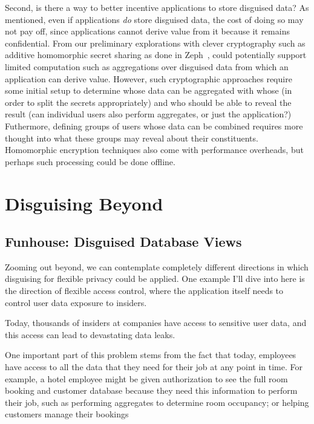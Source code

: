 %
Second, is there a way to better incentive applications to store disguised data?
As mentioned, even if applications \emph{do} store disguised data, the cost of
doing so may not pay off, since applications cannot derive value from it because
it remains confidential. 
%
From our preliminary explorations with clever cryptography such as additive
homomorphic secret sharing as done in Zeph~\cite{zeph}, \sys could potentially
support limited computation such as aggregations over disguised data from which
an application can derive value.
%
However, such cryptographic approaches require some initial setup to determine
whose data can be aggregated with whose (in order to split the secrets
appropriately) and who should be able to reveal the result (can individual users
also perform aggregates, or just the application?)
Futhermore, defining groups of users whose data can be combined requires more thought into what these groups may reveal about their constituents.
%
Homomorphic encryption techniques also come with performance overheads, but
perhaps such processing could be done offline.


\section{Disguising Beyond \sys}


\subsection{Funhouse: Disguised Database Views}
Zooming out beyond, we can contemplate completely different directions in which
disguising for flexible privacy could be applied. One example I’ll dive into
here is the direction of flexible access control, where the application itself
needs to control user data exposure to insiders.

Today, thousands of insiders at companies have access to sensitive user data,
and this access can lead to devastating data leaks.

One important part of this problem stems from the fact that today, employees
have access to all the data that they need for their job at any point in time.
For example, a hotel employee might be given authorization to see the full room
booking and customer database because they need this information to perform
their job, such as performing aggregates to determine room occupancy; or helping
customers manage their bookings

